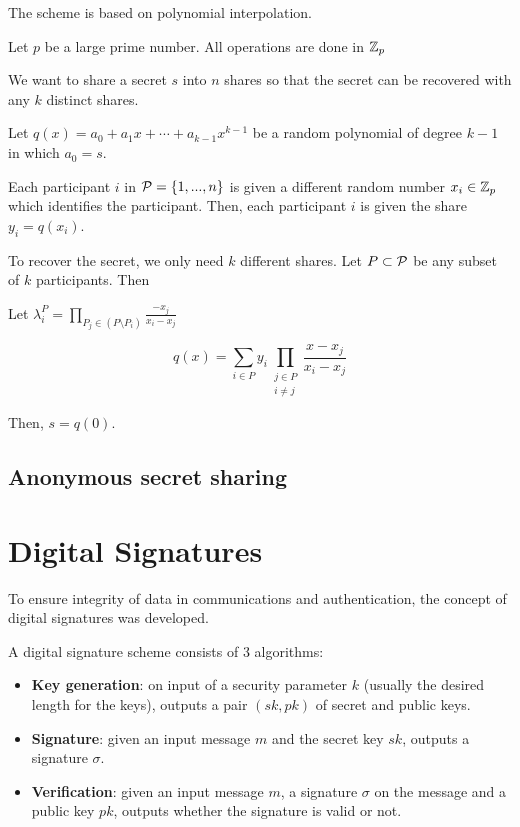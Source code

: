 The scheme is based on polynomial interpolation.

Let $p$ be a large prime number. All operations are done in ${\mathbb Z}_p$

We want to share a secret $s$ into $n$ shares so that the secret can be recovered with any $k$ distinct shares.

Let $q(x) = a_0 + a_1 x + \cdots + a_{k-1} x^{k-1}$ be a random polynomial of degree $k-1$ in which $a_0 = s$.

Each participant $i$ in ${\mathcal P} = \{ 1, ... , n \}$ is given a different random number $x_i \in {\mathbb Z}_p$ which identifies the participant.
Then, each participant $i$ is given the share $y_i = q(x_i)$.

To recover the secret, we only need $k$ different shares. Let $P \subset {\mathcal P}$ be any subset of $k$ participants. Then

Let $\lambda_i^{P} = \prod_{P_j \in (P \setminus P_i)} \frac{-x_j}{x_i - x_j}$

$$
    q(x) = \sum_{i \in P} y_i \prod_{\substack{j \in P \\ i \neq j}} \frac{x-x_j}{x_i-x_j}
$$

Then, $s = q(0)$.

\subsection{Anonymous secret sharing}


\section{Digital Signatures}
To ensure integrity of data in communications and authentication, the concept of digital signatures was developed. 

A digital signature scheme consists of 3 algorithms:
\begin{itemize}
    \item \textbf{Key generation}: on input of a security parameter $k$ (usually the desired length for the keys), outputs a pair $(sk, pk)$ of secret and public keys.
    \item \textbf{Signature}: given an input message $m$ and the secret key $sk$, outputs a signature $\sigma$.
    \item \textbf{Verification}: given an input message $m$, a signature $\sigma$ on the message and a public key $pk$, outputs whether the signature is valid or not.
\end{itemize}

